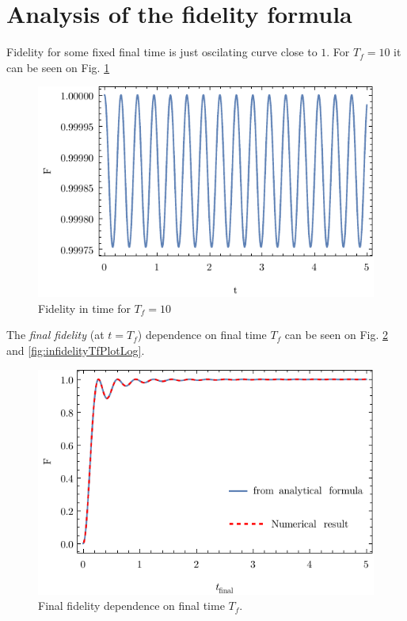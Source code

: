 \section{Analysis of the fidelity formula}
Fidelity for some fixed final time is just oscilating curve close to $1$. For $T_f=10$ it can be seen on Fig. \ref{fig:infidelityTimePlot}
\begin{figure}[H]
    \centering
    \includegraphics[scale=1.2]{../img/infidelityTimePlot.pdf}
    \caption{Fidelity in time for $T_f=10$}
    \label{fig:infidelityTimePlot}
\end{figure}
The \emph{final fidelity} (at $t=T_f$) dependence on final time $T_f$ can be seen on Fig. \ref{fig:infidelityTfPlot} and \ref{fig:infidelityTfPlotLog}.
\begin{figure}[H]
    \centering
    \includegraphics[scale=1.2]{../img/infidelityTfPlot.pdf}
    \caption{Final fidelity dependence on final time $T_f$.}
    \label{fig:infidelityTfPlot}
\end{figure}


